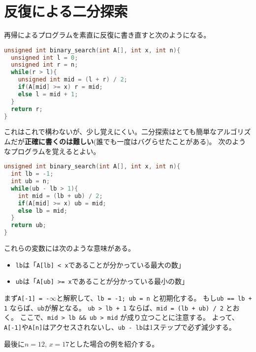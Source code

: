 \documentclass[a4paper,twoside,onecolumn,openany,article,10pt]{memoir}
\theoremstyle{remark}
\begin{document}
\section{反復による二分探索}
再帰によるプログラムを素直に反復に書き直すと次のようになる。
\begin{lstlisting}[basicstyle=\ttfamily\normalsize,showstringspaces=false,language=C,frame=single]
unsigned int binary_search(int A[], int x, int n){
  unsigned int l = 0;
  unsigned int r = n;
  while(r > l){
    unsigned int mid = (l + r) / 2;
    if(A[mid] >= x) r = mid;
    else l = mid + 1;
  }
  return r;
}
\end{lstlisting}
これはこれで構わないが、少し覚えにくい。二分探索はとても簡単なアルゴリズムだが\textbf{正確に書くのは難しい}(誰でも一度はバグらせたことがある)。
次のようなプログラムを覚えるとよい。
\begin{lstlisting}[basicstyle=\ttfamily\normalsize,showstringspaces=false,language=C,frame=single]
unsigned int binary_search(int A[], int x, int n){
  int lb = -1;
  int ub = n;
  while(ub - lb > 1){
    int mid = (lb + ub) / 2;
    if(A[mid] >= x) ub = mid;
    else lb = mid;
  }
  return ub;
}
\end{lstlisting}
これらの変数には次のような意味がある。
\begin{itemize}
\item \texttt{lb}は「\texttt{A[lb] < x}であることが分かっている最大の数」
\item \texttt{ub}は「\texttt{A[ub] >= x}であることが分かっている最小の数」
\end{itemize}
まず\texttt{A[-1] = -$\infty$}と解釈して、\texttt{lb = -1; ub = n} と初期化する。
もし\texttt{ub == lb + 1} ならば、\texttt{ub}が解となる。
\texttt{ub > lb + 1} ならば、\texttt{mid = (lb + ub) / 2} とおく。
ここで、\texttt{mid > lb \&\& ub > mid} が成り立つことに注意する。
よって、\texttt{A[-1]}や\texttt{A[n]}はアクセスされないし、\texttt{ub - lb}は1ステップで必ず減少する。


最後に$n=12,\, x = 17$とした場合の例を紹介する。

\begin{center}
\end{center}
\end{document}
